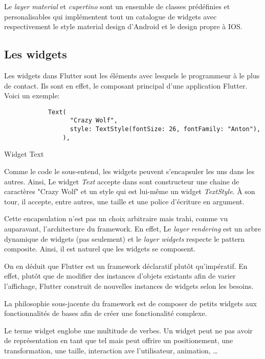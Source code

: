     Le \textit{layer} \textit{material} et \textit{cupertino} sont un ensemble de classes prédéfinies et personalisables qui implémentent tout un catalogue 
    de widgets avec respectivement le style material design d'Android et le design propre à IOS.
    
    \subsection{Les widgets}
    Les widgets dans Flutter sont les éléments avec lesquels le programmeur à le plus de contact. Ils sont en effet, le composant principal d'une application
    Flutter. Voici un exemple:

    \begin{listing}[!h]
        \begin{verbatim}
            Text(
                  "Crazy Wolf",
                  style: TextStyle(fontSize: 26, fontFamily: "Anton"),
                ),
        \end{verbatim}
    \caption{Widget Text}
    \label{code:textWidget}
    \end{listing}

    Comme le code le sous-entend, les widgets peuvent s'encapsuler les uns dans les autres. Ainsi, 
    Le widget \textit{Text} accepte dans sont constructeur une chaine de caractères "Crazy Wolf" et un style qui est lui-même un
    widget \textit{TextStyle}. À son tour, il accepte, entre autres, une taille et une police d'écriture en argument.

    Cette encapsulation n'est pas un choix arbitraire mais trahi, comme vu auparavant, l'architecture du framework. En effet, 
    Le \textit{layer} \textit{rendering} est un arbre dynamique de widgets (pas seulement) et le \textit{layer} \textit{widgets}
    respecte le pattern composite. Ainsi, il est naturel que les widgets se composent.

    On en déduit que Flutter est un framework déclaratif plutôt	qu'impératif. En effet, plutôt que de modifier des instances d'objets existants
    afin de varier l'affichage, Flutter construit de nouvelles instances de widgets selon les besoins.

    La philosophie sous-jacente du framework est de composer de petits widgets aux fonctionnalités de bases afin de 
    créer une fonctionalité complexe. 
    
    Le terme widget englobe une multitude de verbes. Un widget peut ne pas avoir de représentation en tant que tel
    mais peut offrire un positionement, une transformation, une taille, interaction ave l'utilisateur, animation, \dots 
    
